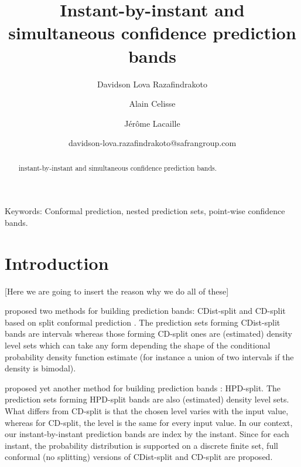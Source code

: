 \documentclass[11pt]{article}
\begin{document}
\author[1, 2]{Davidson Lova Razafindrakoto}
\author[1]{Alain Celisse}
\author[2]{Jérôme Lacaille}

\title{
    Instant-by-instant and simultaneous confidence prediction bands
}

\date{davidson-lova.razafindrakoto@safrangroup.com}

\maketitle

\begin{abstract}
    instant-by-instant and simultaneous confidence prediction bands.
\end{abstract}

Keywords: Conformal prediction, nested prediction sets, point-wise confidence bands.

\section{Introduction}
\label{sec.intro}

[Here we are going to insert the reason why we do all of these]

\citet{izbicki2019flexible} proposed two methods for building prediction bands:
CDist-split and CD-split based on split conformal prediction \citep{vovk2005algorithmic}.
The prediction sets forming CDist-split bands are intervals whereas
those forming CD-split ones are (estimated) density level sets which can take any form depending the shape of the conditional probability density function estimate
(for instance a union of two intervals if the density is bimodal).

\citet{izbicki2022cd} proposed yet another method for building prediction bands : HPD-split.
The prediction sets forming HPD-split bands are also (estimated) density level sets.
What differs from CD-split is that the chosen level varies with the input value, whereas for CD-split, the level is the same for every input value.
In our context, our instant-by-instant prediction bands are index by the instant.
Since for each instant, the probability distribution is supported on a discrete finite set,
full conformal (no splitting) versions of CDist-split and CD-split are proposed.
\end{document}

